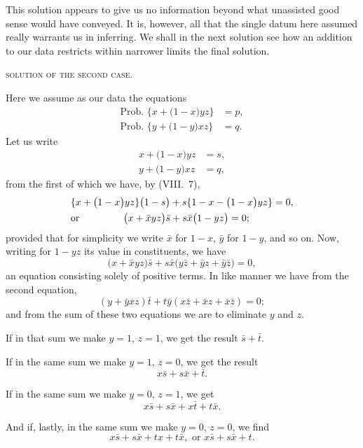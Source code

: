 \documentclass[oneside]{book}
\begin{document}
This solution appears to give us no information beyond what
unassisted good sense would have conveyed. It is, however, all
that the single datum here assumed really warrants us in inferring.
We shall in the next solution see how an addition to our
data restricts within narrower limits the final solution.

\begin{center}\textsc{solution of the second case.}\end{center}

Here we assume as our data the equations
\begin{align*}
  \textrm{Prob. }\{ x + \bigl( 1 - x \bigr)yz \} &= p,  \\
  \textrm{Prob. }\{ y + \bigl( 1 - y \bigr)xz \} &= q.
\end{align*}
Let us write
\begin{align*}
  x + \bigl( 1 - x \bigr)yz &= s,  \\
  y + \bigl( 1 - y \bigr)xz &= q,
\end{align*}
from the first of which we have, by (VIII.~7),
\begin{gather*}
  \{x+\bigl( 1-x \bigr)yz\} \bigl( 1-s \bigr)
+ s \{1 - x - \bigl( 1 - x \bigr)yz\} = 0,
\\
  \textrm{or}\hfill \bigl( x + \bar{x}yz \bigr)\bar{s}
+ s\bar{x}\bigl( 1 - yz \bigr) = 0;\hfill
\end{gather*}
provided that for simplicity we write $\bar{x}$ for $1 - x$, $\bar{y}$ for $1 - y$, and
so on. Now, writing for $1 - yz$ its value in constituents, we
have
\begin{equation*}
\bigl( x + \bar{x}yz \bigr)\bar{s}
+ s\bar{x}\bigl( y\bar{z} + \bar{y}z + \bar{y}\bar{z} \bigr) = 0,
\end{equation*}
an equation consisting solely of positive terms.
In like manner we have from the second equation,
\[(y+  \bar{y}xz) \bar{t} + t\bar{y} (x\bar{z} + \bar{x}z + \bar{x}\bar{z}) =0;\]
and from the sum of these two equations we are to eliminate $y$
and $z$.

If in that sum we make $y = 1$, $z = 1$, we get the result $\bar{s}+ \bar{t}$.

If in the same sum we make $y = 1$, $z = 0$, we get the result
\[ x\bar{s} + s\bar{x} + \bar{t}.  \]

If in the same sum we make $y = 0$, $z = 1$, we get
\[ x\bar{s} + s \bar{x} + x\bar{t} +t \bar{x}.\]

And if, lastly, in the same sum we make $y = 0$, $z = 0$, we find
\[  x\bar{s} + s \bar{x} + tx + t\bar{x}, \text { or } x\bar{s} + s\bar{x} + t. \]
\end{document}
